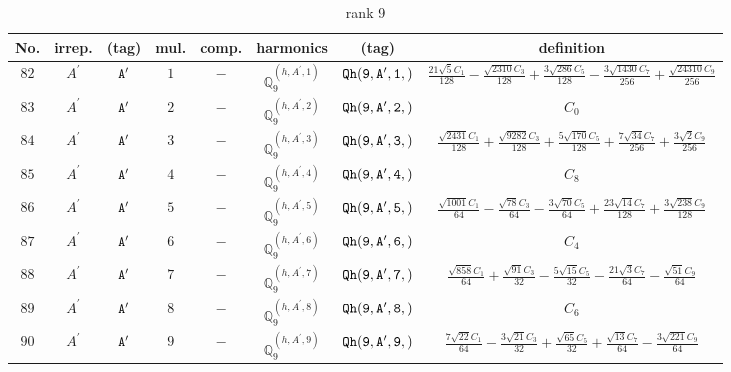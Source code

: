 \documentclass[fleqn,8pt]{jsarticle}
\begin{document}
\begin{table}[ht!]
\begin{center}
\caption{rank 9}
\renewcommand{\arraystretch}{1.3}
\begin{tabular}{cccccccc} \hline \hline
No. & irrep. & (tag) & mul. & comp. & harmonics & (tag) & definition \\ \hline
$ 82 $ & $ A^{\prime} $ & $ {\tt A'} $ & $ 1 $ & $ - $ & $ \mathbb{Q}_{9}^{(h,A^{\prime},1)} $ & $ {\tt Qh(9,A',1,)} $ & $ \frac{21 \sqrt{5} C_{1}}{128} - \frac{\sqrt{2310} C_{3}}{128} + \frac{3 \sqrt{286} C_{5}}{128} - \frac{3 \sqrt{1430} C_{7}}{256} + \frac{\sqrt{24310} C_{9}}{256} $ \\
$ 83 $ & $ A^{\prime} $ & $ {\tt A'} $ & $ 2 $ & $ - $ & $ \mathbb{Q}_{9}^{(h,A^{\prime},2)} $ & $ {\tt Qh(9,A',2,)} $ & $ C_{0} $ \\
$ 84 $ & $ A^{\prime} $ & $ {\tt A'} $ & $ 3 $ & $ - $ & $ \mathbb{Q}_{9}^{(h,A^{\prime},3)} $ & $ {\tt Qh(9,A',3,)} $ & $ \frac{\sqrt{2431} C_{1}}{128} + \frac{\sqrt{9282} C_{3}}{128} + \frac{5 \sqrt{170} C_{5}}{128} + \frac{7 \sqrt{34} C_{7}}{256} + \frac{3 \sqrt{2} C_{9}}{256} $ \\
$ 85 $ & $ A^{\prime} $ & $ {\tt A'} $ & $ 4 $ & $ - $ & $ \mathbb{Q}_{9}^{(h,A^{\prime},4)} $ & $ {\tt Qh(9,A',4,)} $ & $ C_{8} $ \\
$ 86 $ & $ A^{\prime} $ & $ {\tt A'} $ & $ 5 $ & $ - $ & $ \mathbb{Q}_{9}^{(h,A^{\prime},5)} $ & $ {\tt Qh(9,A',5,)} $ & $ \frac{\sqrt{1001} C_{1}}{64} - \frac{\sqrt{78} C_{3}}{64} - \frac{3 \sqrt{70} C_{5}}{64} + \frac{23 \sqrt{14} C_{7}}{128} + \frac{3 \sqrt{238} C_{9}}{128} $ \\
$ 87 $ & $ A^{\prime} $ & $ {\tt A'} $ & $ 6 $ & $ - $ & $ \mathbb{Q}_{9}^{(h,A^{\prime},6)} $ & $ {\tt Qh(9,A',6,)} $ & $ C_{4} $ \\
$ 88 $ & $ A^{\prime} $ & $ {\tt A'} $ & $ 7 $ & $ - $ & $ \mathbb{Q}_{9}^{(h,A^{\prime},7)} $ & $ {\tt Qh(9,A',7,)} $ & $ \frac{\sqrt{858} C_{1}}{64} + \frac{\sqrt{91} C_{3}}{32} - \frac{5 \sqrt{15} C_{5}}{32} - \frac{21 \sqrt{3} C_{7}}{64} - \frac{\sqrt{51} C_{9}}{64} $ \\
$ 89 $ & $ A^{\prime} $ & $ {\tt A'} $ & $ 8 $ & $ - $ & $ \mathbb{Q}_{9}^{(h,A^{\prime},8)} $ & $ {\tt Qh(9,A',8,)} $ & $ C_{6} $ \\
$ 90 $ & $ A^{\prime} $ & $ {\tt A'} $ & $ 9 $ & $ - $ & $ \mathbb{Q}_{9}^{(h,A^{\prime},9)} $ & $ {\tt Qh(9,A',9,)} $ & $ \frac{7 \sqrt{22} C_{1}}{64} - \frac{3 \sqrt{21} C_{3}}{32} + \frac{\sqrt{65} C_{5}}{32} + \frac{\sqrt{13} C_{7}}{64} - \frac{3 \sqrt{221} C_{9}}{64} $ \\

\end{tabular}
\end{center}
\end{table}
\end{document}
